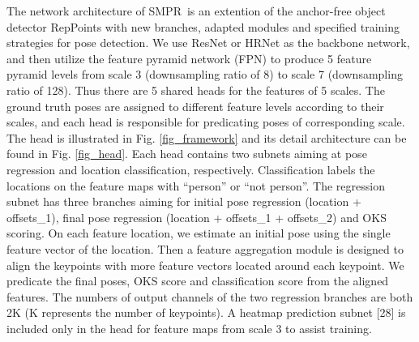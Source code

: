 \documentclass[11pt,twocolumn,journal]{IEEEtran}
\newcommand{\fig}{Fig. }
\newcommand{\SMPR}{SMPR}
\begin{document}
The network architecture of \SMPR~is an extention of the anchor-free object detector RepPoints \cite{reppoints19} with new branches, adapted modules and specified training strategies for pose detection. We use ResNet \cite{he2016deep} or HRNet \cite{sun2019deep} as the backbone network, and then utilize the feature pyramid network (FPN) \cite{fpn17} to produce 5 feature pyramid levels from scale 3 (downsampling ratio of 8) to scale 7 (downsampling ratio of 128).   
Thus there are 5 shared heads for the features of 5 scales. The ground truth poses are assigned to different feature levels according to their scales, and each head is responsible for predicating poses of corresponding scale. 
The head is illustrated in \fig\ref{fig_framework} and its detail architecture can be found in \fig\ref{fig_head}. 
Each head contains two subnets aiming at pose regression and location classification, respectively. Classification labels the locations on the feature maps with “person” or “not person”. 
The regression subnet has three branches aiming for initial pose regression (location + offsets\_1), final pose regression (location + offsets\_1 + offsets\_2) and OKS scoring. 
On each feature location, we estimate an initial pose using the single feature vector of the location. 
Then a feature aggregation module is designed to align the keypoints with more feature vectors located around each keypoint. We predicate the final poses, OKS score and classification score from the aligned features. 
The numbers of output channels of the two regression branches are both 2K (K represents the number of keypoints). 
A heatmap prediction subnet [28] is included only in the head for feature maps from scale 3 to assist training.
\end{document}

